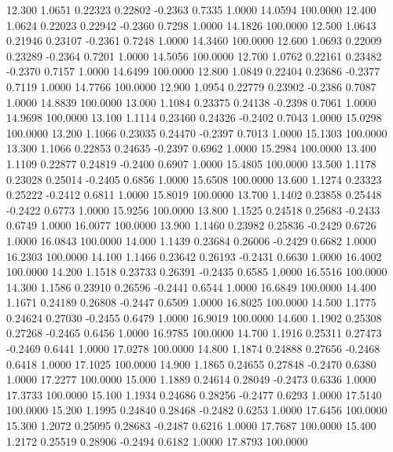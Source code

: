   12.300   1.0651   0.22323   0.22802  -0.2363   0.7335   1.0000  14.0594 100.0000
  12.400   1.0624   0.22023   0.22942  -0.2360   0.7298   1.0000  14.1826 100.0000
  12.500   1.0643   0.21946   0.23107  -0.2361   0.7248   1.0000  14.3460 100.0000
  12.600   1.0693   0.22009   0.23289  -0.2364   0.7201   1.0000  14.5056 100.0000
  12.700   1.0762   0.22161   0.23482  -0.2370   0.7157   1.0000  14.6499 100.0000
  12.800   1.0849   0.22404   0.23686  -0.2377   0.7119   1.0000  14.7766 100.0000
  12.900   1.0954   0.22779   0.23902  -0.2386   0.7087   1.0000  14.8839 100.0000
  13.000   1.1084   0.23375   0.24138  -0.2398   0.7061   1.0000  14.9698 100.0000
  13.100   1.1114   0.23460   0.24326  -0.2402   0.7043   1.0000  15.0298 100.0000
  13.200   1.1066   0.23035   0.24470  -0.2397   0.7013   1.0000  15.1303 100.0000
  13.300   1.1066   0.22853   0.24635  -0.2397   0.6962   1.0000  15.2984 100.0000
  13.400   1.1109   0.22877   0.24819  -0.2400   0.6907   1.0000  15.4805 100.0000
  13.500   1.1178   0.23028   0.25014  -0.2405   0.6856   1.0000  15.6508 100.0000
  13.600   1.1274   0.23323   0.25222  -0.2412   0.6811   1.0000  15.8019 100.0000
  13.700   1.1402   0.23858   0.25448  -0.2422   0.6773   1.0000  15.9256 100.0000
  13.800   1.1525   0.24518   0.25683  -0.2433   0.6749   1.0000  16.0077 100.0000
  13.900   1.1460   0.23982   0.25836  -0.2429   0.6726   1.0000  16.0843 100.0000
  14.000   1.1439   0.23684   0.26006  -0.2429   0.6682   1.0000  16.2303 100.0000
  14.100   1.1466   0.23642   0.26193  -0.2431   0.6630   1.0000  16.4002 100.0000
  14.200   1.1518   0.23733   0.26391  -0.2435   0.6585   1.0000  16.5516 100.0000
  14.300   1.1586   0.23910   0.26596  -0.2441   0.6544   1.0000  16.6849 100.0000
  14.400   1.1671   0.24189   0.26808  -0.2447   0.6509   1.0000  16.8025 100.0000
  14.500   1.1775   0.24624   0.27030  -0.2455   0.6479   1.0000  16.9019 100.0000
  14.600   1.1902   0.25308   0.27268  -0.2465   0.6456   1.0000  16.9785 100.0000
  14.700   1.1916   0.25311   0.27473  -0.2469   0.6441   1.0000  17.0278 100.0000
  14.800   1.1874   0.24888   0.27656  -0.2468   0.6418   1.0000  17.1025 100.0000
  14.900   1.1865   0.24655   0.27848  -0.2470   0.6380   1.0000  17.2277 100.0000
  15.000   1.1889   0.24614   0.28049  -0.2473   0.6336   1.0000  17.3733 100.0000
  15.100   1.1934   0.24686   0.28256  -0.2477   0.6293   1.0000  17.5140 100.0000
  15.200   1.1995   0.24840   0.28468  -0.2482   0.6253   1.0000  17.6456 100.0000
  15.300   1.2072   0.25095   0.28683  -0.2487   0.6216   1.0000  17.7687 100.0000
  15.400   1.2172   0.25519   0.28906  -0.2494   0.6182   1.0000  17.8793 100.0000
